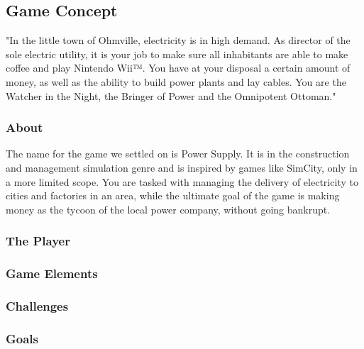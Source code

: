 \subsection{Game Concept}

"In the little town of Ohmville, electricity is in high demand. As director of the sole electric 
utility, it is your job to make sure all inhabitants are able to make coffee and play Nintendo Wii™. 
You have at your disposal a certain amount of money, as well as the ability to build power plants 
and lay cables. You are the Watcher in the Night, the Bringer of Power and the Omnipotent Ottoman."


\subsubsection{About}
The name for the game we settled on is Power Supply. It is in the construction and management simulation genre and is inspired by games like SimCity, only in a more limited scope. You are tasked with managing the delivery of electricity to cities and factories in an area, while the ultimate goal of the game is making money as the tycoon of the local power company, without going bankrupt.

\subsubsection{The Player}

\subsubsection{Game Elements}

\subsubsection{Challenges}

\subsubsection{Goals}
